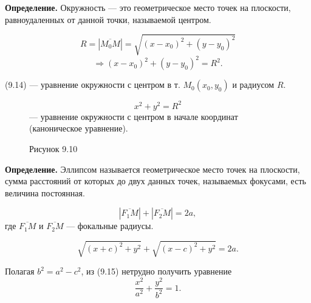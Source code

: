 \documentclass[12pt,a4paper]{article}
\begin{document}
\textbf{Определение.} Окружность --- это геометрическое место точек
на плоскости, равноудаленных от данной точки, называемой центром.

$$
R=|\overline{M_0M}|=\sqrt{(x-x_0)^2+(y-y_0)^2}
$$
\begin{equation}
  \Rightarrow (x-x_0)^2+(y-y_0)^2=R^2. \tag{9.14}
\end{equation}

(9.14) --- уравнение окружности с центром в т. $M_0(x_0,y_0)$ и радиусом $R$.

\begin{figure}[H]
  \centering
  \begin{minipage}{0.4\textwidth}
    \centering
    \caption*{Рисунок 9.10}
  \end{minipage}%
  \begin{minipage}{0.55\textwidth}
    $$
    x^2+y^2=R^2
    $$
    --- уравнение окружности с центром в начале координат
    (каноническое уравнение).
  \end{minipage}
\end{figure}

\textbf{Определение.} Эллипсом называется геометрическое место точек
на плоскости, сумма расстояний от которых до двух данных точек,
называемых фокусами, есть величина постоянная.

$$
|\overline{F_1M}|+|\overline{F_2M}|=2a,
$$
где $\overline{F_1M}$ и $\overline{F_2M}$ --- фокальные радиусы.

\begin{equation}
  \sqrt{(x+c)^2+y^2}+\sqrt{(x-c)^2+y^2}
  =
  2a. \tag{9.15}
\end{equation}

Полагая $b^2=a^2-c^2$, из (9.15) нетрудно получить уравнение
\begin{equation}
  \frac{x^2}{a^2}+\frac{y^2}{b^2}=1. \tag{9.16}
\end{equation}
\end{document}
